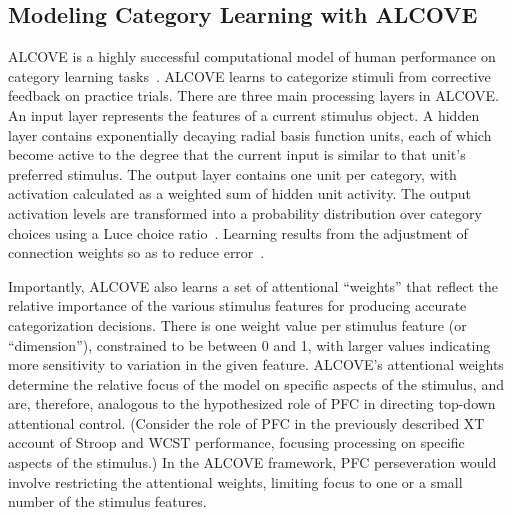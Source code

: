 
\subsection{Modeling Category Learning with ALCOVE}
ALCOVE is a highly successful computational model of human performance on category learning tasks~\cite{KruschkeJK:1992:ALCOVE}. ALCOVE learns to categorize stimuli from corrective feedback on practice trials. There are three main processing layers in ALCOVE. An input layer represents the features of a current stimulus object. A hidden layer contains exponentially decaying radial basis function units, each of which become active to the degree that the current input is similar to that unit's preferred stimulus. The output layer contains one unit per category, with activation calculated as a weighted sum of hidden unit activity. The output activation levels are transformed into a probability distribution over category choices using a Luce choice ratio~\cite{LuceRD:1963:Ratio}. Learning results from the adjustment of connection weights so as to reduce error~\cite{KruschkeJK:1992:ALCOVE}.

Importantly, ALCOVE also learns a set of attentional ``weights'' that reflect the relative importance of the various stimulus features for producing accurate categorization decisions. There is one weight value per stimulus feature (or ``dimension''), constrained to be between 0 and 1, with larger values indicating more sensitivity to variation in the given feature. ALCOVE's attentional weights determine the relative focus of the model on specific aspects of the stimulus, and are, therefore, analogous to the hypothesized role of PFC in directing top-down attentional control. (Consider the role of PFC in the previously described XT account of Stroop and WCST performance, focusing processing on specific aspects of the stimulus.) In the ALCOVE framework, PFC perseveration would involve restricting the attentional weights, limiting focus to one or a small number of the stimulus features.  

